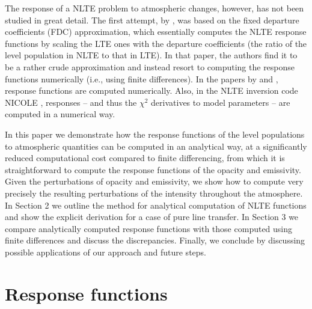 \documentclass[referee]{aa}
\begin{document}
The response of a NLTE problem to atmospheric changes, however, has not been studied in great detail. The first attempt, by \citet{HectorI}, was based on the   fixed departure coefficients (FDC) approximation, which essentially computes the NLTE response functions by scaling the LTE ones with the departure coefficients (the ratio of the level population in NLTE to that in LTE). In that paper, the authors find it to be a rather crude approximation and instead resort to computing the response functions numerically (i.e., using finite differences). In the papers by \citet{Hector_halpha} and \citet{Han06}, response functions are computed numerically. Also, in the NLTE inversion code NICOLE \citep{NICOLE}, responses -- and thus the $\chi^2$ derivatives to model parameters -- are computed in a numerical way.

In this paper we demonstrate how the response functions of the level populations to atmospheric quantities can be computed in an analytical way, at a significantly reduced computational cost  compared to finite differencing, from which it is straightforward to compute the response functions of the opacity and emissivity. Given the perturbations of opacity and emissivity, we show how to compute very precisely the resulting perturbations of the intensity throughout the atmosphere. In Section 2 we outline the method for analytical computation of NLTE functions and show the explicit derivation for a case of pure line transfer. In Section 3 we compare analytically computed response functions with those computed using finite differences and discuss the discrepancies. Finally, we conclude by discussing possible applications of our approach and future steps. 

\section{Response functions}
\label{concept}
\end{document}
